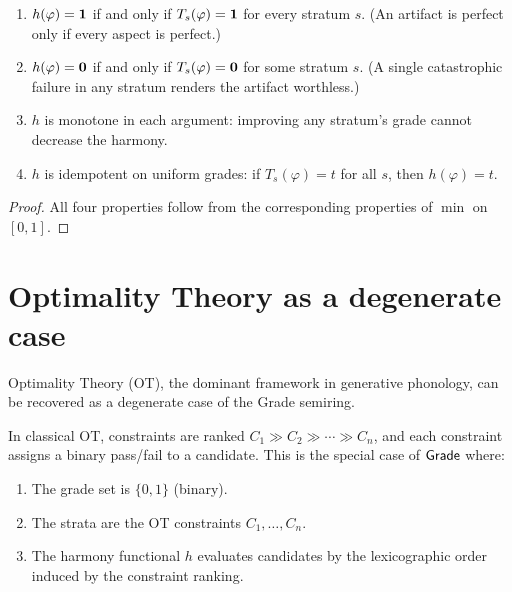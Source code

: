 \begin{proposition}
\label{prop:harmony-properties}
\begin{enumerate}
\item $h(\varphi) = \mathbf{1}$ if and only if $T_s(\varphi) = \mathbf{1}$ for
  every stratum $s$.  (An artifact is perfect only if every aspect is
  perfect.)

\item $h(\varphi) = \mathbf{0}$ if and only if $T_s(\varphi) = \mathbf{0}$
  for some stratum $s$.  (A single catastrophic failure in any
  stratum renders the artifact worthless.)

\item $h$ is monotone in each argument: improving any stratum's grade
  cannot decrease the harmony.

\item $h$ is idempotent on uniform grades: if $T_s(\varphi) = t$ for
  all $s$, then $h(\varphi) = t$.
\end{enumerate}
\end{proposition}

\begin{proof}
All four properties follow from the corresponding properties of $\min$
on $[0, 1]$.
\end{proof}



\section{Optimality Theory as a degenerate case}
\label{sec:grade:ot}

Optimality Theory (OT), the dominant framework in generative phonology,
can be recovered as a degenerate case of the Grade semiring.

\begin{proposition}
\label{prop:ot-special-case}
In classical OT, constraints are ranked $C_1 \gg C_2 \gg \cdots \gg C_n$,
and each constraint assigns a binary pass/fail to a candidate.  This is
the special case of $\mathsf{Grade}$ where:
\begin{enumerate}[nosep]
\item The grade set is $\{0, 1\}$ (binary).
\item The strata are the OT constraints $C_1, \ldots, C_n$.
\item The harmony functional $h$ evaluates candidates by the
  lexicographic order induced by the constraint ranking.
\end{enumerate}
\end{proposition}


